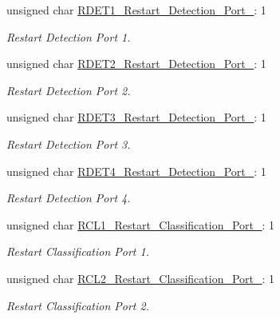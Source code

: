 \begin{DoxyCompactItemize}
\item 
unsigned char \hyperlink{struct_t_p_s238x___detect___class___restart___register__t_af5753eb1d15bae041b21b7ca6b46d937}{R\-D\-E\-T1\-\_\-\-Restart\-\_\-\-Detection\-\_\-\-Port\-\_}\-: 1
\begin{DoxyCompactList}\small\item\em Restart Detection Port 1. \end{DoxyCompactList}\item 
unsigned char \hyperlink{struct_t_p_s238x___detect___class___restart___register__t_aa485e72bc733bbb0b1af3ea8dfb22031}{R\-D\-E\-T2\-\_\-\-Restart\-\_\-\-Detection\-\_\-\-Port\-\_}\-: 1
\begin{DoxyCompactList}\small\item\em Restart Detection Port 2. \end{DoxyCompactList}\item 
unsigned char \hyperlink{struct_t_p_s238x___detect___class___restart___register__t_a852a35ff46f0f8ab137ece2ee0b9e806}{R\-D\-E\-T3\-\_\-\-Restart\-\_\-\-Detection\-\_\-\-Port\-\_}\-: 1
\begin{DoxyCompactList}\small\item\em Restart Detection Port 3. \end{DoxyCompactList}\item 
unsigned char \hyperlink{struct_t_p_s238x___detect___class___restart___register__t_a3e1cd9de9840b5982e356eabdbed284f}{R\-D\-E\-T4\-\_\-\-Restart\-\_\-\-Detection\-\_\-\-Port\-\_}\-: 1
\begin{DoxyCompactList}\small\item\em Restart Detection Port 4. \end{DoxyCompactList}\item 
unsigned char \hyperlink{struct_t_p_s238x___detect___class___restart___register__t_a74d7ce95b9258dfa72f633ad19680060}{R\-C\-L1\-\_\-\-Restart\-\_\-\-Classification\-\_\-\-Port\-\_}\-: 1
\begin{DoxyCompactList}\small\item\em Restart Classification Port 1. \end{DoxyCompactList}\item 
unsigned char \hyperlink{struct_t_p_s238x___detect___class___restart___register__t_a7264ab49fa6014314c5adb6884151eed}{R\-C\-L2\-\_\-\-Restart\-\_\-\-Classification\-\_\-\-Port\-\_}\-: 1
\begin{DoxyCompactList}\small\item\em Restart Classification Port 2. \end{DoxyCompactList}\item 

\end{DoxyCompactItemize}

